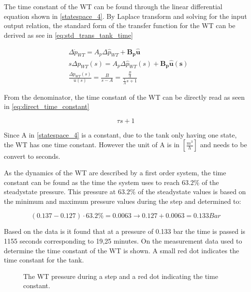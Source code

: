The time constant of the WT can be found through the linear differential equation shown in \eqref{statespace_4}. By Laplace transform and solving for the input output relation, the standard form of the transfer function for the WT can be derived as see in \eqref{eq:std_trans_tank_time}

\begin{equation}
	\begin{split}
	&\Delta \dot{p}_{WT} = A_p \Delta \hat{p}_{WT}  + \pmb{B_p}\pmb{\hat{u}}\\
	&s\Delta p_{WT}(s) = A_p \Delta \hat{p}_{WT}(s)  + \pmb{B_p}\pmb{\hat{u}(s)}\\
	&\frac{\Delta p_{WT}(s)}{u(s)} = \frac{B}{s-A} = \frac{\frac{B}{A}}{\frac{1}{A}s + 1}
	\end{split}
	\label{eq:std_trans_tank_time}
\end{equation}

From the denominator, the time constant of the WT can be directly read as seen in \eqref{eq:direct_time_constant}

\begin{equation}
	\tau s + 1
	\label{eq:direct_time_constant}
\end{equation}

 Since A in \eqref{statespace_4} is a constant, due to the tank only having one state, the WT has one time constant. However the unit of A is in $[\frac{m^3}{h}]$ and needs to be convert to seconds. 

As the dynamics of the WT are described by a first order system, the time constant can be found as the time the system uses to reach $63.2\%$ of the steadystate pressure.
This pressure at $63.2\%$ of the steadystate values is based on the minimum and maximum pressure values during the step and determined to:

\begin{equation}
(0.137 - 0.127)\cdot63.2 \% = 0.0063 \rightarrow 0.127 + 0.0063 = 0.133 Bar 
\end{equation}

Based on the data is it found that at a pressure of 0.133 bar the time is passed is 1155 seconds corresponding to 19,25 minutes. 
On  the measurement data used to determine the time constant of the WT is shown. A small red dot indicates the time constant for the tank.

\begin{figure}[H]

\caption{The WT pressure during a step and a red dot indicating the time constant.}
\label{fig:Test_WT_Timeconstant}
\end{figure}

